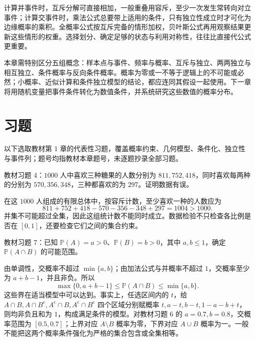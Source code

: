 计算并事件时，互斥分解可直接相加，一般重叠用容斥，至少一次发生常转向对立事件；计算交事件时，乘法公式总要带上适用的条件，只有独立性成立时才可化为边缘概率的乘积。全概率公式按互斥完备的情形加权，贝叶斯公式再用观察结果更新这些情形的权重。选择划分、确定足够的状态与利用对称性，往往比直接代公式更重要。

本章需特别区分五组概念：样本点与事件、频率与概率、互斥与独立、两两独立与相互独立、条件概率与反向条件概率。概率为零或一不等于逻辑上的不可能或必然；小概率、近似计算和条件独立模型的结论，都应连同其假设一起使用。下一章将用随机变量把事件条件转化为数值条件，并系统研究这些数值的概率分布。

\section*{习题}

以下选取教材第 1 章的代表性习题，覆盖概率约束、几何模型、条件化、独立性与事件列；题号均指教材本章题号，未逐题抄录全部习题。

\begin{example}
\label{ex:study-exercise-candy-data}
教材习题 4：$1000$ 人中喜欢三种糖果的人数分别为 $811,752,418$，同时喜欢每两种的分别为 $570,356,348$，三种都喜欢的为 $297$。证明数据有误。
\end{example}

\begin{solve}
在这 $1000$ 人组成的有限总体中，按容斥计数，至少喜欢一种的人数应为
\[
 811+752+418-570-356-348+297=1004>1000.
\]
并集不可能超过全集，因此这组统计数不能同时成立。数据检验不只检查各比例是否在 $[0,1]$，还要检查它们之间的集合约束。
\end{solve}

\begin{example}
\label{ex:study-exercise-intersection-bounds}
教材习题 7：已知 $\mathbb P(A)=a>0$、$\mathbb P(B)=b>0$，其中 $a,b\le1$，确定 $\mathbb P(A\cap B)$ 的可能范围。
\end{example}

\begin{solve}
由单调性，交概率不超过 $\min\{a,b\}$；由加法公式与并概率不超过 $1$，交概率至少为 $a+b-1$，并且非负。所以
\begin{equation}
 \max\{0,a+b-1\}\le\mathbb P(A\cap B)\le\min\{a,b\}.
 \label{eq:study-frechet-bounds}
\end{equation}
这些界在适当模型中可以达到。事实上，任选区间内的 $t$，给 $A\cap B,A\cap B^{\mathrm c},A^{\mathrm c}\cap B,A^{\mathrm c}\cap B^{\mathrm c}$ 四个区域分别赋概率 $t,a-t,b-t,1-a-b+t$，则均非负且和为 $1$，构成满足条件的模型。对教材习题 6 的 $a=0.7,b=0.8$，交概率范围为 $[0.5,0.7]$；上界对应 $A\setminus B$ 概率为零，下界对应 $A\cup B$ 概率为一。一般不能把这两个概率条件强化为严格的集合包含或全集相等。
\end{solve}

